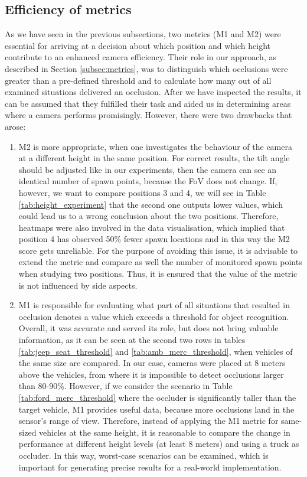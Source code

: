 \subsection{Efficiency of metrics} \label{subsec:efficiency_metrics}
As we have seen in the previous subsections, two metrics (M1 and M2) were essential for arriving at a decision about which position and which height contribute to an enhanced camera efficiency. Their role in our approach, as described in Section \ref{subsec:metrics}, was to distinguish which occlusions were greater than a pre-defined threshold and to calculate how many out of all examined situations delivered an occlusion. After we have inspected the results, it can be assumed that they fulfilled their task and aided us in determining areas where a camera performs promisingly. However, there were two drawbacks that arose:
\begin{enumerate}
    \item M2 is more appropriate, when one investigates the behaviour of the camera at a different height in the same position. For correct results, the tilt angle should be adjusted like in our experiments, then the camera can see an identical number of spawn points, because the FoV does not change. If, however, we want to compare positions 3 and 4, we will see in Table \ref{tab:height_experiment} that the second one outputs lower values, which could lead us to a wrong conclusion about the two positions. Therefore, heatmaps were also involved in the data visualisation, which implied that position 4 has observed 50\% fewer spawn locations and in this way the M2 score gets unreliable. For the purpose of avoiding this issue, it is advisable to extend the metric and compare as well the number of monitored spawn points when studying two positions. Thus, it is ensured that the value of the metric is not influenced by side aspects.
    \item M1 is responsible for evaluating what part of all situations that resulted in occlusion denotes a value which exceeds a threshold for object recognition. Overall, it was accurate and served its role, but does not bring valuable information, as it can be seen at the second two rows in tables \ref{tab:jeep_seat_threshold} and \ref{tab:amb_merc_threshold}, when vehicles of the same size are compared. In our case, cameras were placed at 8 meters above the vehicles, from where it is impossible to detect occlusions larger than 80-90\%. However, if we consider the scenario in Table \ref{tab:ford_merc_threshold} where the occluder is significantly taller than the target vehicle, M1 provides useful data, because more occlusions land in the sensor's range of view. Therefore, instead of applying the M1 metric for same-sized vehicles at the same height, it is reasonable to compare the change in performance at different height levels (at least 8 meters) and using a truck as occluder. In this way, worst-case scenarios can be examined, which is important for generating precise results for a real-world implementation. 
\end{enumerate}
